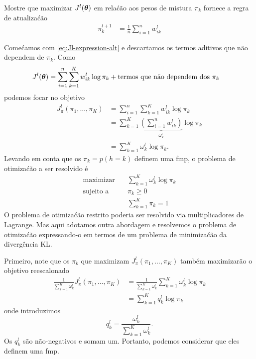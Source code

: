 \begin{exenumerate}
    \item Mostre que maximizar $J^l(\boldsymbol{\theta})$ em rela\'c\~ao aos pesos de mistura
    $\pi_k$ fornece a regra de atualiza\'c\~ao
    \begin{align}
        \pi_k^{l+1} &=  \frac{1}{n}\sum_{i=1}^n w_{ik}^l
    \end{align}
    \begin{solution}
        Come\'camos com \eqref{eq:Jl-expression-alt} e descartamos os termos aditivos que n\~ao
        dependem de $\pi_k$. Como
        \begin{align}
            J^l(\boldsymbol{\theta}) & =  \sum_{i=1}^n  \sum_{k=1}^K w_{ik}^l  \log \pi_k + \text{termos que n\~ao dependem dos } \pi_k
        \end{align}
        podemos focar no objetivo
        \begin{align}
            J^l_\pi(\pi_1, \ldots, \pi_K) & = \sum_{i=1}^n  \sum_{k=1}^K w_{ik}^l  \log \pi_k\\ 
            &= \sum_{k=1}^K \underbrace{\left( \sum_{i=1}^n w_{ik}^l \right)}_{\omega_k^l}  \log \pi_k \\
            & =  \sum_{k=1}^K \omega_k^l \log \pi_k.
        \end{align}
        Levando em conta que os $\pi_k = p(h=k)$ definem uma fmp, o problema de otimiza\'c\~ao a ser resolvido \'e
        \begin{align}
            \text{maximizar} \quad&  \sum_{k=1}^K \omega_k^l \log \pi_k\\
            \text{sujeito a}\quad &  \pi_k \ge 0 \\
            &  \sum_{k=1}^K \pi_k = 1 
        \end{align}
        O problema de otimiza\'c\~ao restrito poderia ser resolvido via multiplicadores de
        Lagrange. Mas aqui adotamos outra abordagem e resolvemos o problema de otimiza\'c\~ao
        expressando-o em termos de um problema de minimiza\'c\~ao da diverg\^encia KL.
        
        Primeiro, note que os $\pi_k$ que maximizam $J^l_\pi(\pi_1, \ldots,
        \pi_K)$ tamb\'em maximizar\~ao o objetivo reescalonado
        \begin{align}
            \frac{1}{\sum_{k=1}^K \omega_k^l}  J_\pi^l(\pi_1, \ldots, \pi_K) & =  \frac{1}{\sum_{k=1}^K \omega_k^l}\sum_{k=1}^K \omega_k^l \log \pi_k\\
            &=   \sum_{k=1}^K q_k^l \log \pi_k
        \end{align}
        onde introduzimos
        \begin{equation}
            q_k^l = \frac{\omega_k^l}{\sum_{k=1}^K \omega_{k}^l}.
        \end{equation}
        Os $q_k^l$ s\~ao n\~ao-negativos e somam um. Portanto, podemos considerar que eles
        definem uma fmp.
        

\end{solution}
\end{exenumerate}
